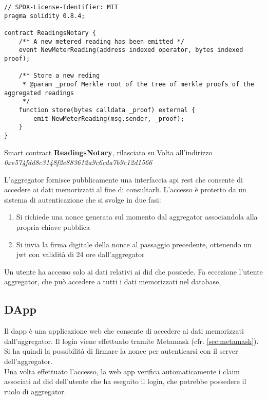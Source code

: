 \begin{listing}[h]
    \begin{verbatim}
// SPDX-License-Identifier: MIT
pragma solidity 0.8.4;

contract ReadingsNotary {
    /** A new metered reading has been emitted */
    event NewMeterReading(address indexed operator, bytes indexed proof);

    /** Store a new reding
     * @param _proof Merkle root of the tree of merkle proofs of the aggregated readings
     */
    function store(bytes calldata _proof) external {
        emit NewMeterReading(msg.sender, _proof);
    }
}
\end{verbatim}
    \caption{Smart contract \textbf{ReadingsNotary}, rilasciato su Volta all'indirizzo \textit{0xe574fdd8c3148f2e883612a9c6cda7b9c12d1566}}\label{lab:readings-notary}
\end{listing}

L'\gls{aggregator} fornisce pubblicamente una interfaccia \gls{api} \gls{rest} che consente di accedere ai dati memorizzati al fine di consultarli.
L'accesso è protetto da un sistema di autenticazione che si svolge in due fasi:

\begin{enumerate}
    \item Si richiede una nonce generata sul momento dal \gls{aggregator} associandola alla propria chiave pubblica
    \item Si invia la firma digitale della nonce al passaggio precedente, ottenendo un \gls{jwt} con validità di 24 ore dall'\gls{aggregator}
\end{enumerate}

Un utente ha accesso solo ai dati relativi ai \gls{did} che possiede.
Fa eccezione l'utente \gls{aggregator}, che può accedere a tutti i dati memorizzati nel database.

\subsection{DApp}
Il \gls{dapp} è una applicazione web che consente di accedere ai dati memorizzati dall'\gls{aggregator}.
Il login viene effettuato tramite Metamask (cfr. \autoref{sec:metamask}).
Si ha quindi la possibilità di firmare la nonce per autenticarsi con il server dell'\gls{aggregator}. \\
Una volta effettuato l'accesso, la web app verifica automaticamente i claim associati ad \gls{did} dell'utente
che ha eseguito il login, che potrebbe possedere il ruolo di \gls{aggregator}. \\

